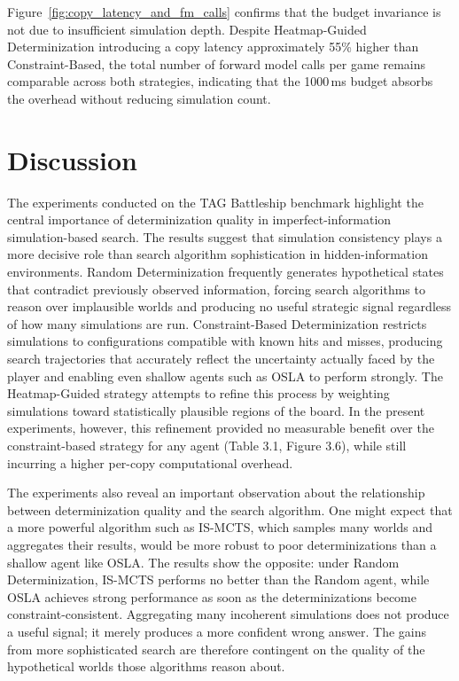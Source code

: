Figure~\ref{fig:copy_latency_and_fm_calls} 
confirms that the budget invariance is not due to insufficient 
simulation depth. Despite Heatmap-Guided Determinization 
introducing a copy latency approximately 55\% higher than 
Constraint-Based, the total number of forward model calls per 
game remains comparable across both strategies, indicating that 
the 1000\,ms budget absorbs the overhead without reducing 
simulation count.


\section{Discussion}
\label{sec:tag_discussion}

The experiments conducted on the TAG Battleship benchmark highlight the central importance of determinization quality in imperfect-information simulation-based search. The results suggest that simulation consistency plays a more decisive role than search algorithm sophistication in hidden-information environments. Random Determinization frequently generates hypothetical states that contradict previously observed information, forcing search algorithms to reason over implausible worlds and producing no useful strategic signal regardless of how many simulations are run. Constraint-Based Determinization restricts simulations to configurations compatible with known hits and misses, producing search trajectories that accurately reflect the uncertainty actually faced by the player and enabling even shallow agents such as OSLA to perform strongly. The Heatmap-Guided strategy attempts to refine this process by weighting simulations toward statistically plausible regions of the board. In the present experiments, however, this refinement provided no measurable benefit over the constraint-based strategy for any agent (Table 3.1, Figure 3.6), while still incurring a higher per-copy computational overhead.

The experiments also reveal an important observation about the relationship between determinization quality and the search algorithm. One might expect that a more powerful algorithm such as IS-MCTS, which samples many worlds and aggregates their results, would be more robust to poor determinizations than a shallow agent like OSLA. The results show the opposite: under Random Determinization, IS-MCTS performs no better than the Random agent, while OSLA achieves strong performance as soon as the determinizations become constraint-consistent. Aggregating many incoherent simulations does not produce a useful signal; it merely produces a more confident wrong answer. The gains from more sophisticated search are therefore contingent on the quality of the hypothetical worlds those algorithms reason about.

